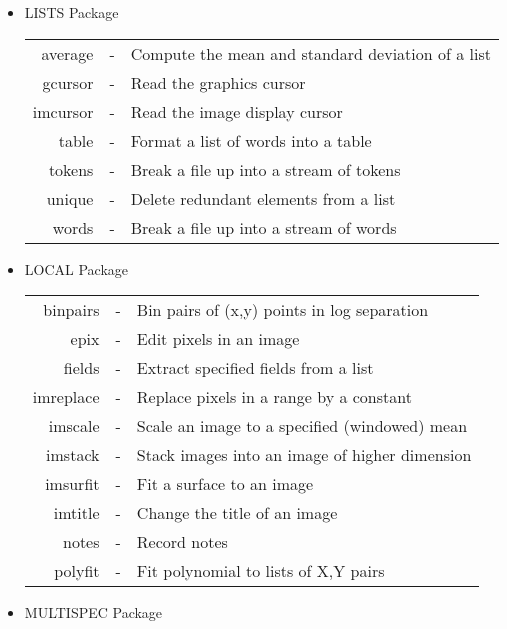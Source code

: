 \begin{itemize}
\begin{tabular}{rcl}
\end{tabular}

\item LISTS Package \\

\begin{tabular}{rcl}

	average & - & Compute the mean and standard deviation of a list\\
	gcursor & - & Read the graphics cursor\\
       imcursor & - & Read the image display cursor\\
	  table & - & Format a list of words into a table\\
	 tokens & - & Break a file up into a stream of tokens\\
	 unique & - & Delete redundant elements from a list\\
	  words & - & Break a file up into a stream of words

\end{tabular}

\clearpage
\item LOCAL Package \\

\begin{tabular}{rcl}

       binpairs & - & Bin pairs of (x,y) points in log separation\\
	   epix & - & Edit pixels in an image\\
	 fields & - & Extract specified fields from a list\\
      imreplace & - & Replace pixels in a range by a constant\\
	imscale & - & Scale an image to a specified (windowed) mean\\
	imstack & - & Stack images into an image of higher dimension\\
       imsurfit	& - & Fit a surface to an image\\
	imtitle & - & Change the title of an image\\
	  notes & - & Record notes\\
        polyfit & - & Fit polynomial to lists of X,Y pairs

\end{tabular}

\item MULTISPEC Package \\

\begin{tabular}{rcl}


\end{tabular}
\end{itemize}
